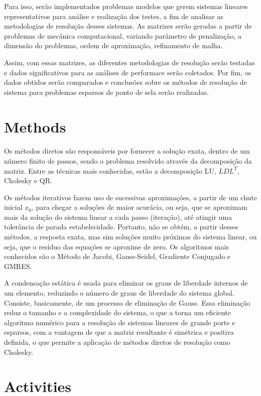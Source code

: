 \documentclass[12pt]{article}
\begin{document}
Para isso, serão implementados problemas modelos que gerem sistemas lineares representativos para análise e realização dos testes, a fim de 
analisar as metodologias de resolução desses sistemas. As matrizes serão geradas a partir de problemas de mecânica computacional, variando 
parâmetro de penalização, a dimensão do problemas, ordem de aproximação, refinamento de malha. 

Assim, com essas matrizes, as diferentes metodologias de resolução serão testadas e dados significativos para as análises de performace serão coletados.
Por fim, os dados obtidos serão comparados e conclusões sobre os métodos de resolução de sistema para problemas esparsos de ponto de sela serão 
realizadas.

\section{Methods}
\paragraph{}
Os métodos diretos são responsáveis por fornecer a solução exata, dentro de um número finito de passos, sendo o problema resolvido através 
da decomposição da matriz. Entre as técnicas mais conhecidas, estão a decomposição LU, \(LDL^T\), Cholesky e QR.

Os métodos iterativos fazem uso de sucessivas aproximações, a partir de um chute inicial \(x_0\), para chegar a soluções de maior acurácia, ou seja, 
que se aproximam mais da solução do sistema linear a cada passo (iteração), até atingir uma tolerância de parada estabelecidade. Portanto, não se obtém, 
a partir desses métodos, a resposta exata, mas sim soluções muito próximas do sistema linear, ou seja, que o resíduo das equações se aproxime de zero. 
Os algoritmos mais conhecidos são o Método de Jacobi, Gauss-Seidel, Gradiente Conjugado e GMRES.

A condensação estática é usada para eliminar os graus de liberdade internos de um elemento, reduzindo o número de graus de liberdade do 
sistema global. Consiste, basicamente, de um processo de eliminação de Gauss.
Essa eliminação reduz o tamanho e a complexidade do sistema, o que a torna um eficiente algoritmo numérico para a resolução de sistemas 
lineares de grande porte e esparsos, com a vantagem de que a matriz resultante é simétrica e positiva definida, o que permite a aplicação de 
métodos diretos de resolução como Cholesky. 

\section{Activities}
\end{document}
